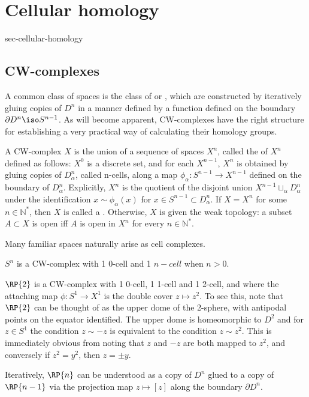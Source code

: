 \section{Cellular homology}{sec-cellular-homology}
\subsection{CW-complexes}
A common class of spaces is the class of  or , which are constructed by iteratively gluing copies of $D^n$ in a manner defined by a function defined on the boundary $\partial D^n \iso S^{n-1}$. As will become apparent, CW-complexes have the right structure for establishing a very practical way of calculating their homology groups.

\begin{definition}
A CW-complex $X$ is the union of a sequence of spaces $X^n$, called the  of $X^n$ defined as follows: $X^0$ is a discrete set, and for each $X^{n-1}$, $X^{n}$ is obtained by gluing copies of $D_{\alpha}^n$, called n-cells, along a map $\phi_{\alpha}:S^{n-1}\rightarrow X^{n-1}$ defined on the boundary of $D_{\alpha}^n$. Explicitly, $X^n$ is the quotient of the disjoint union $X^{n-1}\sqcup_{\alpha} D_{\alpha}^n$ under the identification $x\sim \phi_{\alpha}(x)$ for $x\in S^{n-1}\subset D_{\alpha}^n$. If $X=X^n$ for some $n\in \mathbb{N}^*$, then $X$ is called a . Otherwise, $X$ is given the weak topology: a subset $A\subset X$ is open iff $A$ is open in $X^n$ for every $n\in \mathbb{N}^*$.
\end{definition}

Many familiar spaces naturally arise as cell complexes.

\begin{example}
$S^{n}$ is a CW-complex with 1 0-cell and 1 $n-cell$ when $n>0$. 
\end{example}

\begin{example}
$\RP{2}$ is a CW-complex with 1 0-cell, 1 1-cell and 1 2-cell, and where the attaching map $\phi:S^1\rightarrow X^1$ is the double cover $z\mapsto z^2$. To see this, note that $\RP{2}$ can be thought of as the upper dome of the 2-sphere, with antipodal points on the equator identified. The upper dome is homeomorphic to $D^2$ and for $z\in S^{1}$ the condition $z\sim -z$ is equivalent to the condition $z\sim z^2$. This is immediately obvious from noting that $z$ and $-z$ are both mapped to $z^2$, and conversely if $z^2=y^2$, then $z=\pm y$.

Iteratively, $\RP{n}$ can be understood as a copy of $D^n$ glued to a copy of $\RP{n-1}$ via the projection map $z\mapsto [z]$ along the boundary $\partial D^n$.
\end{example}

